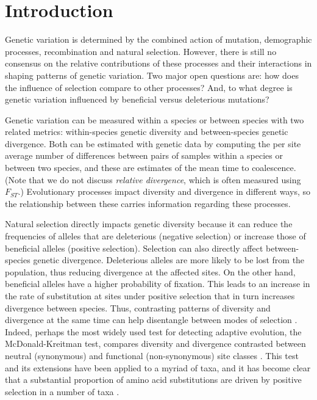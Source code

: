 \section{Introduction}

Genetic variation is determined by the combined action of mutation, demographic processes, recombination and natural selection.
However, there is still no consensus on the relative contributions of these processes and 
their interactions in shaping patterns of genetic variation.
Two major open questions are: how does the influence of selection compare to other processes?
And, to what degree is genetic variation influenced by beneficial versus deleterious mutations?

Genetic variation can be measured within a species or between species with two related metrics: within-species genetic diversity and between-species genetic divergence.
Both can be estimated with genetic data by computing the per site average number of differences between pairs of samples within a species or between two species,
and these are estimates of the mean time to coalescence.
(Note that we do not discuss \emph{relative divergence},
which is often measured using $F_{ST}$.)
Evolutionary processes impact diversity and divergence in different ways, so the relationship between these carries information regarding these processes.

Natural selection directly impacts genetic diversity because it can reduce the frequencies of alleles that are deleterious (negative selection)
or increase those of beneficial alleles (positive selection).
Selection can also directly affect between-species genetic divergence.
Deleterious alleles are more likely to be lost from the population, thus reducing divergence at the affected sites.
On the other hand, beneficial alleles have a higher probability of fixation.
This leads to an increase in the rate of substitution at sites under positive selection that in turn
increases divergence between species.
Thus, contrasting patterns of diversity and divergence at the same time can help disentangle between modes of selection \parencite{hudson_test_1987}.
Indeed, perhaps the most widely used test for detecting adaptive evolution, the McDonald-Kreitman test,
compares diversity and divergence contrasted between neutral (\eg synonymous) and functional (\eg non-synonymous) site classes \parencite{mcdonald_adaptive_1991}.
This test and its extensions have been applied to a myriad of taxa,
and it has become clear that a substantial proportion of amino acid substitutions
are driven by positive selection in a number of taxa \parencite{smith_adaptive_2002, ingvarsson_natural_2010, slotte_impact_2014,galtier_adaptive_2016}.

